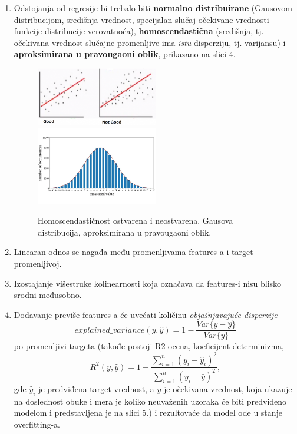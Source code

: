 \documentclass[fontsize=12bp, paper=a4]{scrarticle}
\begin{document}
\begin{enumerate}
    \item Odstojanja od regresije bi trebalo biti \textbf{normalno distribuirane} (Gausovom distribucijom, središnja vrednost, specijalan slučaj očekivane vrednosti funkcije distribucije verovatnoća)\cite{mean}\cite{variance}\cite{gaus}, \textbf{homoscendastična} (središnja, tj. očekivana vrednost slučajne promenljive ima \textit{istu} disperziju, tj. varijansu) i \textbf{aproksimirana u pravougaoni oblik}, prikazano na slici 4.
    
    \begin{figure}[h!]
        \centering
        \includegraphics[width=0.5\textwidth]{4.png}
        \includegraphics[width=0.5\textwidth]{4a.png}
        \caption{\centering Homoscendastičnost ostvarena i neostvarena. Gausova distribucija, aproksimirana u pravougaoni oblik.}
    \end{figure}
    \item Linearan odnos se nagađa među promenljivama features-a i target promenljivoj.
    \item Izostajanje višestruke kolinearnosti koja označava da features-i nisu blisko srodni međusobno.\cite{colinear}
    \item Dodavanje previše features-a će uvećati količinu \textit{objašnjavajuće disperzije} 
    $$explained\_{}variance(y, \hat{y}) = 1 - \frac{Var\{ y - \hat{y}\}}{Var\{y\}}$$
     po promenljivi targeta (takođe postoji R2 ocena, koeficijent determinizma, 
     $$R^2(y, \hat{y}) = 1 - \frac{\sum_{i=1}^{n} (y_i - \hat{y}_i)^2}{\sum_{i=1}^{n} (y_i - \bar{y})^2},$$ gde $\hat{y}_i$ je predviđena target vrednost, a $\bar{y}$ je očekivana vrednost, koja ukazuje na doslednost obuke i mera je koliko neuvaženih uzoraka će biti predviđeno modelom i predstavljena je na slici 5.)\cite{explainedVar}\cite{r2}\cite{hat} i rezultovaće da model ode u stanje overfitting-a.


\end{enumerate}
\end{document}
